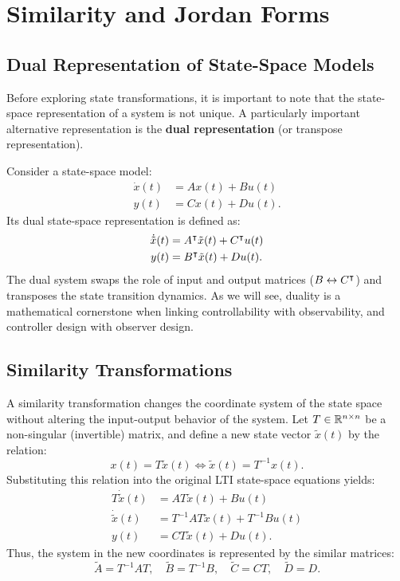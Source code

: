\chapter{Similarity and Jordan Forms}

\section{Dual Representation of State-Space Models}
Before exploring state transformations, it is important to note that the state-space representation of a system is not unique. A particularly important alternative representation is the \textbf{dual representation} (or transpose representation).

Consider a state-space model:
\begin{align}
    \dot{x}(t) &= A x(t) + B u(t) \\
y(t) &= C x(t) + D u(t) .
\end{align}
Its dual state-space representation is defined as:
\begin{align}
    \dot{\tilde{x}}(t) &= A^\intercal \tilde{x}(t) + C^\intercal u(t) \\
y(t) &= B^\intercal \tilde{x}(t) + D u(t) .
\end{align}
The dual system swaps the role of input and output matrices ($B \leftrightarrow C^\intercal$) and transposes the state transition dynamics. As we will see, duality is a mathematical cornerstone when linking controllability with observability, and controller design with observer design.

\section{Similarity Transformations}
A similarity transformation changes the coordinate system of the state space without altering the input-output behavior of the system. Let $T \in \mathbb{R}^{n \times n}$ be a non-singular (invertible) matrix, and define a new state vector $\tilde{x}(t)$ by the relation:
\begin{equation}
x(t) = T \tilde{x}(t) \iff \tilde{x}(t) = T^{-1} x(t) .
\end{equation}
Substituting this relation into the original LTI state-space equations yields:
\begin{align}
    T \dot{\tilde{x}}(t) &= A T \tilde{x}(t) + B u(t) \nonumber \\
    \dot{\tilde{x}}(t) &= T^{-1} A T \tilde{x}(t) + T^{-1} B u(t) \\
y(t) &= C T \tilde{x}(t) + D u(t) .
\end{align}
Thus, the system in the new coordinates is represented by the similar matrices:
\begin{equation}
\tilde{A} = T^{-1} A T, \quad \tilde{B} = T^{-1} B, \quad \tilde{C} = C T, \quad \tilde{D} = D .
\end{equation}

